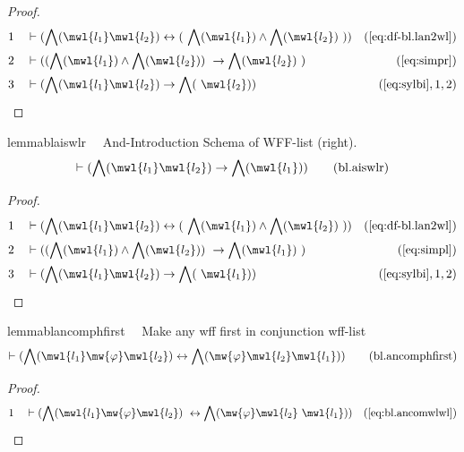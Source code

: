 \begin{proof}
\begin{align}
  1 &&  & \vdash ( \bigwedge( \mwl{l_1} \mwl{l_2} ) \leftrightarrow (
     ~\bigwedge( \mwl{l_1} ) \wedge \bigwedge( \mwl{l_2} )
     ~) )&(\mbox{\ref{eq:df-bl.lan2wl}})\notag
  \\ 2 &&  & \vdash ( ( \bigwedge( \mwl{l_1} ) \wedge \bigwedge( \mwl{l_2} ) )
     ~\rightarrow \bigwedge( \mwl{l_2} )
     ~)&(\mbox{\ref{eq:simpr}})\notag
  \\ 3 &&  & \vdash ( \bigwedge( \mwl{l_1} \mwl{l_2} ) \rightarrow \bigwedge(
     ~\mwl{l_2} ) )&(\mbox{\ref{eq:sylbi}},1,2)\notag
\end{align}
\end{proof}

\begin{restatable}{lemma}{blaiswlr}~~ And-Introduction Schema of WFF-list
(right).
\begin{align}
\vdash ( \bigwedge( \mwl{l_1} \mwl{l_2} ) \rightarrow \bigwedge( \mwl{l_1} )
    )\label{eq:bl.aiswlr}\tag{bl.aiswlr}
\end{align}
\end{restatable}

\begin{proof}
\begin{align}
  1 &&  & \vdash ( \bigwedge( \mwl{l_1} \mwl{l_2} ) \leftrightarrow (
     ~\bigwedge( \mwl{l_1} ) \wedge \bigwedge( \mwl{l_2} )
     ~) )&(\mbox{\ref{eq:df-bl.lan2wl}})\notag
  \\ 2 &&  & \vdash ( ( \bigwedge( \mwl{l_1} ) \wedge \bigwedge( \mwl{l_2} ) )
     ~\rightarrow \bigwedge( \mwl{l_1} )
     ~)&(\mbox{\ref{eq:simpl}})\notag
  \\ 3 &&  & \vdash ( \bigwedge( \mwl{l_1} \mwl{l_2} ) \rightarrow \bigwedge(
     ~\mwl{l_1} ) )&(\mbox{\ref{eq:sylbi}},1,2)\notag
\end{align}
\end{proof}

\begin{restatable}{lemma}{blancomphfirst}~~ Make any wff first in conjunction
wff-list
\begin{align}
\vdash ( \bigwedge( \mwl{l_1} \mw{\varphi} \mwl{l_2} ) \leftrightarrow
    \bigwedge( \mw{\varphi} \mwl{l_2} \mwl{l_1} )
    )\label{eq:bl.ancomphfirst}\tag{bl.ancomphfirst}
\end{align}
\end{restatable}

\begin{proof}
\begin{align}
  1 &&  & \vdash ( \bigwedge( \mwl{l_1} \mw{\varphi} \mwl{l_2} )
     ~\leftrightarrow \bigwedge( \mw{\varphi} \mwl{l_2}
     ~\mwl{l_1} ) )&(\mbox{\ref{eq:bl.ancomwlwl}})\notag
\end{align}
\end{proof}


